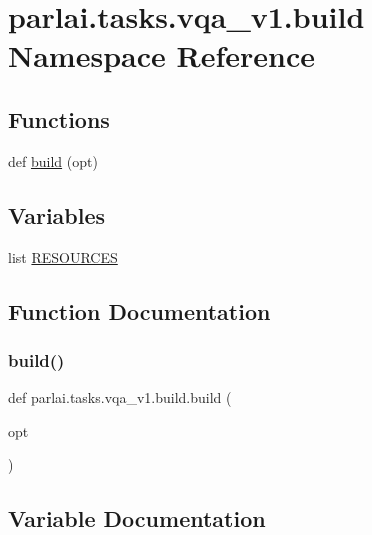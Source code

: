 \hypertarget{namespaceparlai_1_1tasks_1_1vqa__v1_1_1build}{}\section{parlai.\+tasks.\+vqa\+\_\+v1.\+build Namespace Reference}
\label{namespaceparlai_1_1tasks_1_1vqa__v1_1_1build}
\subsection*{Functions}
\begin{DoxyCompactItemize}
\item 
def \hyperlink{namespaceparlai_1_1tasks_1_1vqa__v1_1_1build_a183cd229fa87a5dacae8b5424819df18}{build} (opt)
\end{DoxyCompactItemize}
\subsection*{Variables}
\begin{DoxyCompactItemize}
\item 
list \hyperlink{namespaceparlai_1_1tasks_1_1vqa__v1_1_1build_a854e2d817a3f244dba26de3ea9a78609}{R\+E\+S\+O\+U\+R\+C\+ES}
\end{DoxyCompactItemize}


\subsection{Function Documentation}
\mbox{\label{namespaceparlai_1_1tasks_1_1vqa__v1_1_1build_a183cd229fa87a5dacae8b5424819df18}} 
\subsubsection{\texorpdfstring{build()}{build()}}
{\footnotesize\ttfamily def parlai.\+tasks.\+vqa\+\_\+v1.\+build.\+build (\begin{DoxyParamCaption}\item[{}]{opt }\end{DoxyParamCaption})}



\subsection{Variable Documentation}
\mbox{\label{namespaceparlai_1_1tasks_1_1vqa__v1_1_1build_a854e2d817a3f244dba26de3ea9a78609}} 
